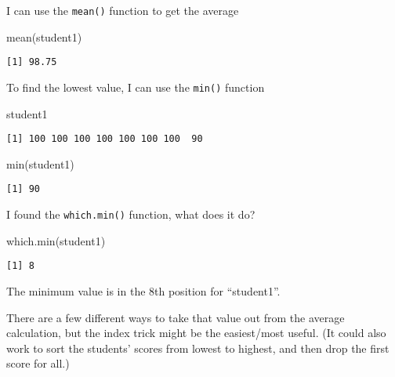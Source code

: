 \documentclass[
  letterpaper,
  DIV=11,
  numbers=noendperiod]{scrartcl}
\newenvironment{Shaded}{\begin{snugshade}}{\end{snugshade}}
\newcommand{\FunctionTok}[1]{\textcolor[rgb]{0.28,0.35,0.67}{#1}}
\newcommand{\NormalTok}[1]{\textcolor[rgb]{0.00,0.23,0.31}{#1}}
\begin{document}
I can use the \texttt{mean()} function to get the average

\begin{Shaded}
\begin{Highlighting}[]
\FunctionTok{mean}\NormalTok{(student1)}
\end{Highlighting}
\end{Shaded}

\begin{verbatim}
[1] 98.75
\end{verbatim}

To find the lowest value, I can use the \texttt{min()} function

\begin{Shaded}
\begin{Highlighting}[]
\NormalTok{student1}
\end{Highlighting}
\end{Shaded}

\begin{verbatim}
[1] 100 100 100 100 100 100 100  90
\end{verbatim}

\begin{Shaded}
\begin{Highlighting}[]
\FunctionTok{min}\NormalTok{(student1)}
\end{Highlighting}
\end{Shaded}

\begin{verbatim}
[1] 90
\end{verbatim}

I found the \texttt{which.min()} function, what does it do?

\begin{Shaded}
\begin{Highlighting}[]
\FunctionTok{which.min}\NormalTok{(student1)}
\end{Highlighting}
\end{Shaded}

\begin{verbatim}
[1] 8
\end{verbatim}

The minimum value is in the 8th position for ``student1''.

There are a few different ways to take that value out from the average
calculation, but the index trick might be the easiest/most useful. (It
could also work to sort the students' scores from lowest to highest, and
then drop the first score for all.)
\end{document}
